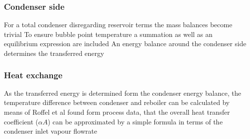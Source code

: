     \subsubsection{Condenser side}
        For a total condenser disregarding reservoir terms the mass balances become trivial
        To ensure bubble point temperature a summation as well as an equilibrium expression are included
        An energy balance around the condenser side determines the transferred energy

    \subsubsection{Heat exchange}
        As the transferred energy is determined form the condenser energy balance, the temperature
        difference between condenser and reboiler can be calculated by means of
        Roffel et al \cite{Roffel.2000} found form process data, that the overall heat transfer coefficient ($\alpha A$)
        can be approximated by a simple formula in terms of the condenser inlet vapour flowrate



